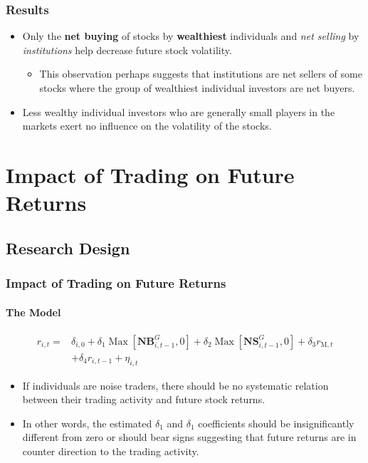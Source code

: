 \documentclass{beamer}
\begin{document}
\begin{frame}
    \frametitle{Results}
    \begin{itemize}
        \item Only the \textbf{net buying} of stocks by \textbf{wealthiest} individuals and \textit{net selling} by \textit{institutions} help decrease future stock volatility.
              \begin{itemize}
                  \item This observation perhaps suggests that institutions are net sellers of some stocks where the group of wealthiest individual investors are net buyers.
              \end{itemize}
        \item Less wealthy individual investors who are generally small players in the markets exert no influence on the volatility of the stocks.
    \end{itemize}
\end{frame}


\section{Impact of Trading on Future Returns}


\subsection*{Research Design}


\begin{frame}
    \frametitle{Impact of Trading on Future Returns}
    \framesubtitle{The Model}
    \begin{align*}
        r_{i, t} = & \delta_{i, 0}+\delta_{1} \operatorname{Max}\left[\mathbf{N B}_{i, t-1}^{G}, 0\right]+\delta_{2} \operatorname{Max}\left[\mathbf{NS}_{i, t-1}^{G}, 0\right]+\delta_{3} r_{\mathrm{M}, t} \\
                   & +\delta_{4} r_{i, t-1}+\eta_{i, t}
    \end{align*}
    \begin{itemize}
        \item If individuals are noise traders, there should be no systematic relation between their trading activity and future stock returns.
        \item In other words, the estimated \(\delta_{1}\) and \(\delta_{1}\) coefficients should be insignificantly different from zero or should bear signs suggesting that future returns are in counter direction to the trading activity.
    \end{itemize}
\end{frame}
\end{document}
